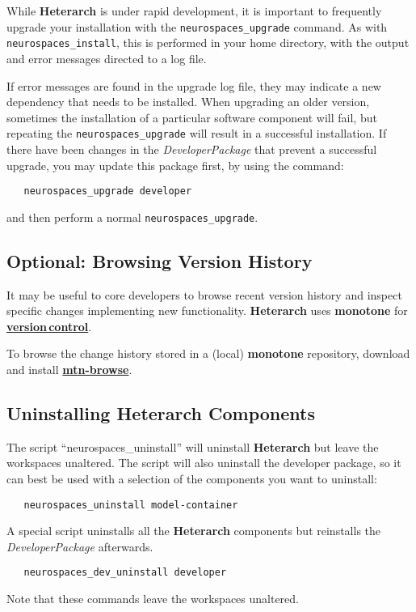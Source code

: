 \documentclass[12pt]{article}
\begin{document}
While {\bf\small{Heterarch}} is under rapid development, it is important to frequently
upgrade your installation with the {\tt neurospaces\_upgrade} command.
As with {\tt neurospaces\_install}, this is performed in your home
directory, with the output and error messages directed to a log file.

If error messages are found in the upgrade log file, they may indicate
a new dependency that needs to be installed.  When upgrading an older
version, sometimes the installation of a particular software component
will fail, but repeating the {\tt neurospaces\_upgrade} will result in a
successful installation.  If there have been changes in the {\it
  DeveloperPackage} that prevent a successful upgrade, you may update
this package first, by using the command:

\begin{verbatim}
   neurospaces_upgrade developer
\end{verbatim}
and then perform a normal {\tt neurospaces\_upgrade}.
 
\subsection*{Optional: Browsing Version History}

It may be useful to core developers to browse recent version history
and inspect specific changes implementing new functionality.  {\bf\small{Heterarch}} uses {\bf monotone} for
\href{../version-control/version-control.tex}{\bf version\,control}.

To browse the change history stored in a (local) {\bf monotone}
repository,
 download and install \href{http://www.coosoft.plus.com/software.html}{\bf mtn-browse}.


\subsection*{Uninstalling Heterarch Components}

The script ``neurospaces\_uninstall'' will uninstall
{\bf\small{Heterarch}} but leave the workspaces unaltered.  The script
will also uninstall the developer package, so it can best be used with
a selection of the components you want to uninstall:

\begin{verbatim}
   neurospaces_uninstall model-container
\end{verbatim}
A special script uninstalls all the {\bf\small{Heterarch}} components but reinstalls the
{\it DeveloperPackage} afterwards.
\begin{verbatim}
   neurospaces_dev_uninstall developer
\end{verbatim}
Note that these commands leave the workspaces unaltered.
\end{document}
